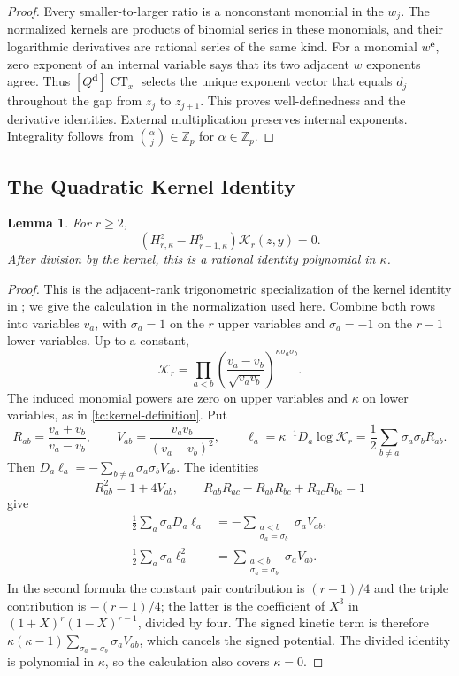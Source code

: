 \documentclass[11pt]{amsart}
\newtheorem{lemma}[theorem]{Lemma}
\theoremstyle{definition}
\theoremstyle{remark}
\numberwithin{equation}{section}
\newcommand{\Z}{\mathbb Z}
\DeclareMathOperator{\CT}{CT}
\begin{document}
\begin{proof}
Every smaller-to-larger ratio is a nonconstant monomial in the
$w_j$. The normalized kernels are products of binomial series
in these monomials, and their logarithmic derivatives are rational
series of the same kind. For a monomial $w^{\boldsymbol e}$,
zero exponent of an internal variable says that its two adjacent
$w$ exponents agree. Thus $[Q^{\boldsymbol d}]\CT_x$ selects
the unique exponent vector that equals $d_j$ throughout the gap
from $z_j$ to $z_{j+1}$. This proves well-definedness and the
derivative identities. External multiplication preserves
internal exponents. Integrality follows from
$\binom\alpha j\in\Z_p$ for $\alpha\in\Z_p$.
\end{proof}

\subsection{The Quadratic Kernel Identity}
\begin{lemma}\label{tc:kernel}
For $r\geq2$,
\begin{equation}\label{tc:kernel-equation}
 (H_{r,\kappa}^{z}-H_{r-1,\kappa}^{y})\mathscr K_r(z,y)=0.
\end{equation}
After division by the kernel, this is a rational identity
polynomial in $\kappa$.
\end{lemma}

\begin{proof}
This is the adjacent-rank trigonometric specialization of the
kernel identity in \cite{Lan06}; we give the calculation in
the normalization used here.
Combine both rows into variables $v_a$, with $\sigma_a=1$ on
the $r$ upper variables and $\sigma_a=-1$ on the $r-1$ lower
variables. Up to a constant,
\[
 \mathscr K_r=
 \prod_{a<b}\left(\frac{v_a-v_b}{\sqrt{v_av_b}}\right)
                   ^{\kappa\sigma_a\sigma_b}.
\]
The induced monomial powers are zero on upper variables and
$\kappa$ on lower variables, as in
\eqref{tc:kernel-definition}. Put
\[
 R_{ab}=\frac{v_a+v_b}{v_a-v_b},\qquad
 V_{ab}=\frac{v_av_b}{(v_a-v_b)^2},\qquad
 \ell_a=\kappa^{-1}D_a\log\mathscr K_r
       =\frac12\sum_{b\ne a}\sigma_a\sigma_bR_{ab}.
\]
Then $D_a\ell_a=-\sum_{b\ne a}\sigma_a\sigma_bV_{ab}$.
The identities
\[
 R_{ab}^2=1+4V_{ab},\qquad
 R_{ab}R_{ac}-R_{ab}R_{bc}+R_{ac}R_{bc}=1
\]
give
\begin{align*}
 \frac12\sum_a\sigma_aD_a\ell_a
 &=-\sum_{\substack{a<b\\\sigma_a=\sigma_b}}\sigma_aV_{ab},\\
 \frac12\sum_a\sigma_a\ell_a^2
 &=\sum_{\substack{a<b\\\sigma_a=\sigma_b}}\sigma_aV_{ab}.
\end{align*}
In the second formula the constant pair contribution is
$(r-1)/4$ and the triple contribution is $-(r-1)/4$;
the latter is the coefficient of $X^3$ in
$(1+X)^r(1-X)^{r-1}$, divided by four.
The signed kinetic term is therefore
$\kappa(\kappa-1)\sum_{\sigma_a=\sigma_b}\sigma_aV_{ab}$,
which cancels the signed potential. The divided identity is
polynomial in $\kappa$, so the calculation also covers
$\kappa=0$.
\end{proof}
\end{document}
